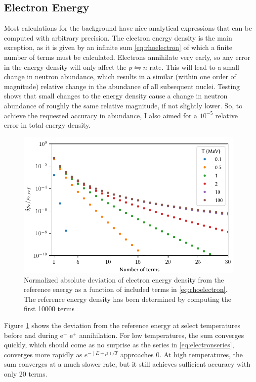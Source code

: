 \subsection{Electron Energy}
Most calculations for the background have nice analytical expressions that can be computed with arbitrary precision. The electron energy density is the main exception, as it is given by an infinite sum \eqref{eq:rhoelectron} of which a finite number of terms must be calculated. Electrons annihilate very early, so any error in the energy density will only affect the $p\leftrightharpoons n$ rate. This will lead to a small change in neutron abundance, which results in a similar (within one order of magnitude) relative change in the abundance of all subsequent nuclei. 
Testing shows that small changes to the energy density cause a change in neutron abundance of roughly the same relative magnitude, if not slightly lower. So, to achieve the requested accuracy in abundance, I also aimed for a $10^{-5}$ relative error in total energy density. 
\begin{figure}[ht!]
    \includegraphics[width=5.1in]{figures/Besselaccuracy.pdf}
    \caption{Normalized absolute deviation of electron energy density from the reference energy as a function of included terms in \eqref{eq:rhoelectron}. The reference energy density has been determined by computing the first 10000 terms}
    \label{fig:Besselaccuracy}
\end{figure}

Figure \ref{fig:Besselaccuracy} shows the deviation from the reference energy at select temperatures before and during e$^-$ e$^+$ annihilation. For low temperatures, the sum converges quickly, which should come as no surprise as the series in \eqref{eq:electronseries}, converges more rapidly as $e^{-(E\pm\mu)/T}$ approaches 0. At high temperatures, the sum converges at a much slower rate, but it still achieves sufficient accuracy with only 20 terms.


